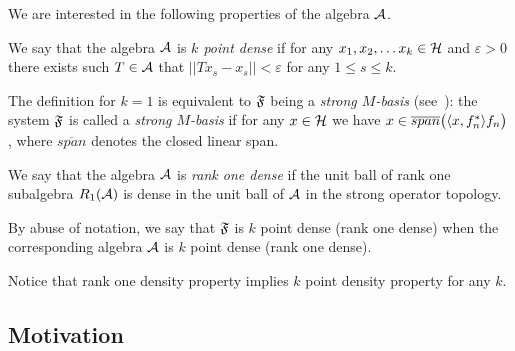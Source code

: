 \documentclass[12pt]{amsart}
\theoremstyle{case}
\begin{document}
    We are interested in the following properties of the algebra $\cal{A}$.
    \begin{definition}
      \label{kpd}
      We say that the algebra $\cal{A}$ is \emph{$k$ point dense} if for any $x_1, x_2,\dots x_k \in \cal{H}$ and $\varepsilon > 0$
        there exists such $T\in \cal{A}$ that $||Tx_s - x_s|| < \varepsilon$ for any $1 \leq s \leq k$.
    \end{definition}
    The definition for $k=1$ is equivalent to $\fsys$ being a \emph{strong $M$-basis} (see~\cite{katavolos}):
      the system $\fsys$ is called a \emph{strong $M$-basis} if for any $x\in\cal{H}$ we have $x \in \overline{span}\big(\inner{x}{f^*_n}f_n\big)$, where
      $\overline{span}$ denotes the closed linear span.
    \begin{definition}
      \label{r1d}
      We say that the algebra $\cal{A}$ is \emph{rank one dense} if the unit ball of rank one subalgebra $R_1(\cal{A})$
        is dense in the unit ball of $\cal{A}$ in the strong operator topology.
    \end{definition}
    By abuse of notation, we say that $\fsys$ is $k$ point dense (rank one dense)
      when the corresponding algebra $\cal{A}$ is $k$ point dense (rank one dense).

    Notice that rank one density property implies $k$ point density property for any $k$.

  \subsection{Motivation}
\end{document}
